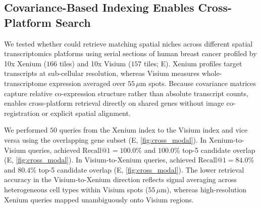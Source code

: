 \documentclass[pdflatex,sn-mathphys-num]{sn-jnl}%
\theoremstyle{thmstyleone}%
\theoremstyle{thmstyletwo}%
\theoremstyle{thmstylethree}%
\begin{document}
\subsection{Covariance-Based Indexing Enables Cross-Platform Search}\label{subsec:crossmodal}

We tested whether \OurMethod{} could retrieve matching spatial niches across different spatial transcriptomics platforms using serial sections of human breast cancer profiled by 10x Xenium ($166$ tiles) and 10x Visium ($157$ tiles; E). Xenium profiles target transcripts at sub-cellular resolution, whereas Visium measures whole-transcriptome expression averaged over $55\,\mu\text{m}$ spots. Because covariance matrices capture relative co-expression structure rather than absolute transcript counts, \OurMethod{} enables cross-platform retrieval directly on shared genes without image co-registration or explicit spatial alignment.

We performed $50$ queries from the Xenium index to the Visium index and vice versa using the overlapping gene subset (E, \cref{fig:cross_modal}). In Xenium-to-Visium queries, \OurMethod{} achieved $\text{Recall}@1 = 100.0\%$ and $100.0\%$ top-5 candidate overlap (E, \cref{fig:cross_modal}). In Visium-to-Xenium queries, \OurMethod{} achieved $\text{Recall}@1 = 84.0\%$ and $80.4\%$ top-5 candidate overlap (E, \cref{fig:cross_modal}). The lower retrieval accuracy in the Visium-to-Xenium direction reflects signal averaging across heterogeneous cell types within Visium spots ($55\,\mu\text{m}$), whereas high-resolution Xenium queries mapped unambiguously onto Visium regions.

\end{document}
